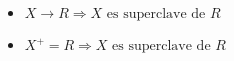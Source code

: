 \documentclass[preview]{standalone}
\begin{document}
\begin{itemize}
\item $X\rightarrow R \Longrightarrow X \text{ es superclave de } R$
\item $X^+ = R \Longrightarrow X \text{ es superclave de } R$
\end{itemize}
\end{document}
